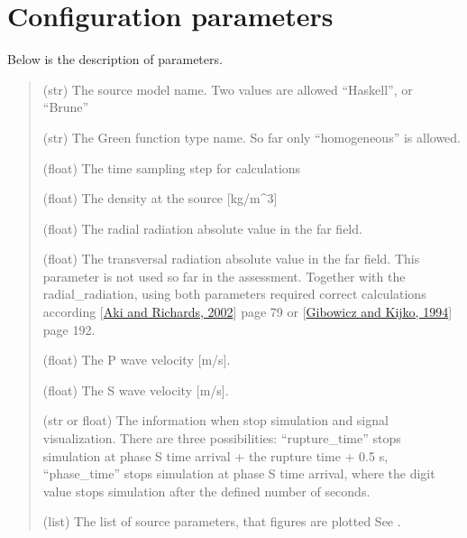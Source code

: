 \documentclass[letterpaper,10pt,english]{sphinxmanual}
\begin{document}
\section{Configuration parameters}
\label{\detokenize{configuration:configuration-parameters}}
\sphinxAtStartPar
Below is the description of parameters.
\begin{quote}\begin{description}
\sphinxAtStartPar
(str) The source model name.
Two values are allowed “Haskell”, or “Brune”

\sphinxAtStartPar
(str) The Green function type  name.
So far only “homogeneous” is allowed.

\sphinxAtStartPar
(float) The time sampling step for calculations

\sphinxAtStartPar
(float) The density at the source {[}kg/m\textasciicircum{}3{]}

\sphinxAtStartPar
(float) The radial radiation absolute value in the far field.

\sphinxAtStartPar
(float) The transversal radiation absolute value in the far field.
This parameter is not used so far in the assessment.
Together with the radial\_radiation, using both parameters required correct calculations
according  {[}\hyperlink{cite.bibliography:id11}{Aki and Richards, 2002}{]} page 79 or  {[}\hyperlink{cite.bibliography:id12}{Gibowicz and Kijko, 1994}{]} page 192.

\sphinxAtStartPar
(float) The P wave velocity {[}m/s{]}.

\sphinxAtStartPar
(float) The S wave velocity {[}m/s{]}.

\sphinxAtStartPar
(str or float) The information when stop simulation and signal visualization.
There are three possibilities: “rupture\_time” stops simulation at phase S time arrival
+ the rupture time + 0.5 s, “phase\_time” stops simulation at phase S time arrival,
where the digit value stops simulation after the defined number of seconds.

\sphinxAtStartPar
(list) The list of source parameters, that figures are plotted
See {\hyperref[\detokenize{configuration:source-parameters-description}]{}}.


\end{description}
\end{quote}
\end{document}
